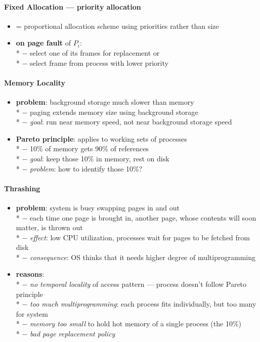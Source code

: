 \paragraph{Fixed Allocation --- priority allocation}
\begin{itemize}
  \item = proportional allocation scheme using priorities rather than size
  \item \textbf{on page fault} of $ P_i $: \\*
    $ - $ select one of its frames for replacement or \\*
    $ - $ select frame from process with lower priority
\end{itemize}

\paragraph{Memory Locality}
\begin{itemize}
  \item \textbf{problem}: background storage much slower than memory \\*
    $ - $ paging extends memory size using background storage \\*
    $ - $ \emph{goal}: run near memory speed, not near background storage speed
  \item \textbf{Pareto principle}: applies to working sets of processes \\*
    $ - $ 10\% of memory gets 90\% of references \\*
    $ - $ \emph{goal}: keep those 10\% in memory, rest on disk \\*
    $ - $ \emph{problem}: how to identify those 10\%?
\end{itemize}

\paragraph{Thrashing}
\begin{itemize}
  \item \textbf{problem}: system is busy swapping pages in and out \\*
    $ - $ each time one page is brought in, another page, whose contents will soon matter, is thrown out \\*
    $ - $ \emph{effect}: low CPU utilization, processes wait for pages to be fetched from disk \\*
    $ - $ \emph{consequence}: OS thinks that it needs higher degree of multiprogramming
  \item \textbf{reasons}: \\*
    $ - $ \emph{no temporal locality} of access pattern --- process doesn't follow Pareto principle \\*
    $ - $ \emph{too much multiprogramming}: each process fits individually, but too many for system \\*
    $ - $ \emph{memory too small} to hold hot memory of a single process (the 10\%) \\*
    $ - $ \emph{bad page replacement policy}
\end{itemize}

